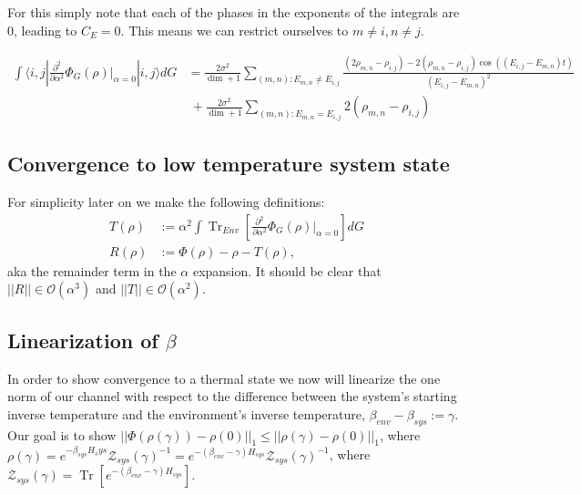 \documentclass{article}
\newcommand{\ket}[1]{|#1\rangle}
\newcommand{\bra}[1]{\langle #1|}
\newcommand{\brackets}[1]{\left[ #1 \right]}
\newcommand{\norm}[1]{\left| \left| #1 \right| \right|}
\newcommand{\bigo}[1]{\mathcal{O}\left( #1 \right)}
\DeclareMathOperator{\Tr}{Tr}
\newcommand{\trace}[1]{\Tr \brackets{ #1 }}
\newcommand{\partrace}[2]{\Tr_{#1} \brackets{ #2 }}
\newcommand{\partfun}{\mathcal{Z}}
\begin{document}
For this simply note that each of the phases in the exponents of the integrals are 0, leading to $C_E = 0$. This means we can restrict ourselves to $m \neq i, n \neq j$. 

\begin{align}
    \int \bra{i,j} \frac{\partial^2}{\partial \alpha^2} \Phi_G(\rho) \bigg|_{\alpha = 0} \ket{i,j} dG &= \frac{2 \sigma^2}{\dim + 1} \sum_{(m,n) : E_{m,n} \neq E_{i,j}} \frac{(2 \rho_{m,n} - \rho_{i,j}) - 2(\rho_{m,n} - \rho_{i,j}) \cos ((E_{i,j} - E_{m,n})t)}{(E_{i,j} - E_{m,n})^2} \nonumber \\
    &~ + \frac{2 \sigma^2}{\dim + 1} \sum_{(m,n) : E_{m,n} = E_{i,j}} 2 (\rho_{m,n} - \rho_{i,j}) \label{eq:second_order_final}
\end{align}

\subsection{Convergence to low temperature system state}
For simplicity later on we make the following definitions:
\begin{align}
    T(\rho) &:= \alpha^2 \int \partrace{Env}{ \frac{\partial^2}{\partial \alpha^2} \Phi_G (\rho) \bigg|_{\alpha=0} } dG \\
    R(\rho) &:= \Phi(\rho) - \rho - T(\rho),
\end{align} 
aka the remainder term in the $\alpha$ expansion. It should be clear that $\norm{R} \in \bigo{\alpha^3}$ and $\norm{T} \in \bigo{\alpha^2}$.

\subsection{Linearization of $\beta$}
In order to show convergence to a thermal state we now will linearize the one norm of our channel with respect to the difference between the system's starting inverse temperature and the environment's inverse temperature, $\beta_{env} - \beta_{sys} := \gamma$. Our goal is to show $\norm{\Phi(\rho(\gamma)) - \rho(0)}_1 \leq \norm{\rho(\gamma) - \rho(0)}_1$, where $\rho(\gamma) = e^{- \beta_{sys} H_sys} \partfun_{sys}(\gamma)^{-1} = e^{-(\beta_{env} - \gamma) H_{sys}} \partfun_{sys}(\gamma)^{-1}$, where $\partfun_{sys}(\gamma) = \trace{e^{-(\beta_{env} - \gamma) H_{sys}}}$.
\end{document}
